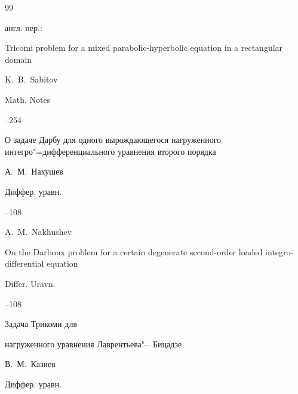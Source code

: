\begin{thebibliography}{99}


\transl англ. пер.:~

\paper Tricomi problem for a mixed parabolic-hyperbolic equation in a rectangular domain

\by K.~B.~Sabitov 

\jour Math. Notes




--254






\paper О задаче Дарбу для одного вырождающегося нагруженного интегро"=дифференциального уравнения второго порядка

\by А.~М.~Нахушев

\jour Диффер. уравн.




--108

\misctransl

\by A.~M.~Nakhushev

\paper On the Darboux problem for a certain degenerate second-order loaded integro-differential equation

\jour Differ. Uravn.




--108






\paper Задача Трикоми для

нагруженного уравнения Лаврентьева"--~Бицадзе

\by В.~М.~Казиев

\jour Диффер. уравн.



\end{thebibliography}
